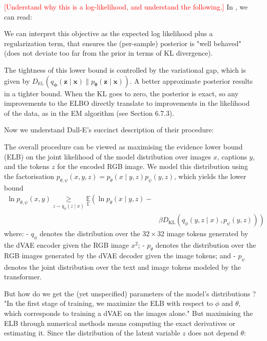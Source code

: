 \documentclass{article}
\begin{document}
\begin{appendix}
\textcolor{red}{[Understand why this is a log-likelihood, and understand the following.]} In \cite{probml-advanced}, we can read:

\begin{displayquote}
We can interpret this objective as the expected log likelihood plus a regularization term, that ensures the (per-sample) posterior is "well behaved" (does not deviate too far from the prior in terms of KL divergence).

The tightness of this lower bound is controlled by the variational gap, which is given by $D_{\mathbb{K} \mathbb{L}}\left(q_{\boldsymbol{\phi}}(\boldsymbol{z} \mid \boldsymbol{x}) \| p_{\boldsymbol{\theta}}(\boldsymbol{z} \mid \boldsymbol{x})\right)$. A better approximate posterior results in a tighter bound. When the KL goes to zero, the posterior is exact, so any improvements to the ELBO directly translate to improvements in the likelihood of the data, as in the EM algorithm (see Section 6.7.3).
\end{displayquote}

Now we understand Dall-E's succinct description of their procedure:
\begin{displayquote}
The overall procedure can be viewed as maximising the evidence lower bound (ELB) on the joint likelihood of the model distribution over images $x$, captions $y$, and the tokens $z$ for the encoded RGB image. We model this distribution using the factorisation $p_{\theta, \psi}(x, y, z)=p_{\theta}(x \mid y, z) p_{\psi}(y, z)$, which yields the lower bound
$$
\begin{aligned}
\ln p_{\theta, \psi}(x, y) \underset{z \sim q_{\phi}(z \mid x)}{\geqslant} \underset{\mathbb{E}}{\mathbb{E}}\left(\ln p_{\theta}(x \mid y, z)-\right.\\
&\left.\beta D_{\mathrm{KL}}\left(q_{\phi}(y, z \mid x), p_{\psi}(y, z)\right)\right)
\end{aligned}
$$
where:
- $q_{\phi}$ denotes the distribution over the $32 \times 32$ image tokens generated by the dVAE encoder given the RGB image $x^{2}$;
- $p_{\theta}$ denotes the distribution over the RGB images generated by the dVAE decoder given the image tokens; and
- $p_{\psi}$ denotes the joint distribution over the text and image tokens modeled by the transformer.
\end{displayquote}

But how do we get the (yet unspecified) parameters of the model's  distributions ? "In the first stage of training, we maximize the ELB with respect to $\phi$ and $\theta$, which corresponds to training a dVAE on the images alone." But maximising the ELB through numerical methods means computing the exact derivatives or estimating it. Since the distribution of the latent variable $z$ does not depend $\theta$:


\end{appendix}
\end{document}
